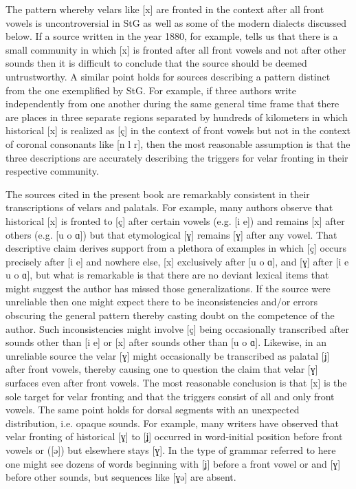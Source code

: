 The pattern whereby velars like [x] are fronted in the context after all front vowels is uncontroversial in StG as well as some of the modern dialects discussed below. If a source written in the year 1880, for example, tells us that there is a small community in which [x] is fronted after all front vowels and not after other sounds then it is difficult to conclude that the source should be deemed untrustworthy. A similar point holds for sources describing a pattern distinct from the one exemplified by StG. For example, if three authors write independently from one another during the same general time frame that there are places in three separate regions separated by hundreds of kilometers in which historical [x] is realized as [ç] in the context of front vowels but not in the context of coronal consonants like [n l r], then the most reasonable assumption is that the three descriptions are accurately describing the triggers for velar fronting in their respective community.

The sources cited in the present book are remarkably consistent in their transcriptions of velars and palatals. For example, many authors observe that historical [x] is fronted to [ç] after certain vowels (e.g. [i e]) and remains [x] after others (e.g. [u o ɑ]) but that etymological [ɣ] remains [ɣ] after any vowel. That descriptive claim derives support from a plethora of examples in which [ç] occurs precisely after [i e] and nowhere else, [x] exclusively after [u o ɑ], and [ɣ] after [i e u o ɑ], but what is remarkable is that there are no deviant lexical items that might suggest the author has missed those generalizations. If the source were unreliable then one might expect there to be inconsistencies and/or errors obscuring the general pattern thereby casting doubt on the competence of the author. Such inconsistencies might involve [ç] being occasionally transcribed after sounds other than [i e] or [x] after sounds other than [u o ɑ]. Likewise, in an unreliable source the velar [ɣ] might occasionally be transcribed as palatal [ʝ] after front vowels, thereby causing one to question the claim that velar [ɣ] surfaces even after front vowels. The most reasonable conclusion is that [x] is the sole target for velar fronting and that the triggers consist of all and only front vowels. The same point holds for dorsal segments with an unexpected distribution, i.e. opaque sounds. For example, many writers have observed that velar fronting of historical [ɣ] to [ʝ] occurred in word-initial position before front vowels or  ([ə]) but elsewhere stays [ɣ]. In the type of grammar referred to here one might see dozens of words beginning with [ʝ] before a front vowel or  and [ɣ] before other sounds, but sequences like [ɣə] are absent.

